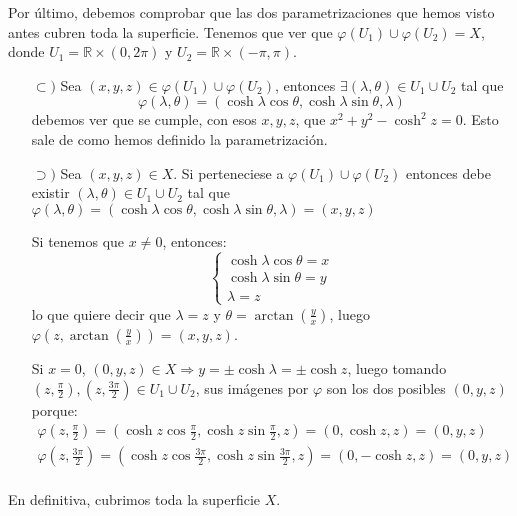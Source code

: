 Por último, debemos comprobar que las dos parametrizaciones que hemos visto
antes cubren toda la superficie. Tenemos que ver que $\varphi\left( U_1 \right) \cup
\varphi\left( U_2 \right) = X$, donde $U_1 = \mathbb{R} \times \left( 0, 2 \pi
\right) $ y $U_2 = \mathbb{R} \times \left( -\pi, \pi \right)$.
\begin{itemize}
\item[$\subset)$] Sea $\left( x, y, z \right) \in \varphi\left( U_1 \right)
    \cup \varphi\left( U_2 \right)$, entonces $\exists \left( \lambda, \theta
    \right) \in U_1 \cup U_2$ tal que
    \[
        \varphi\left( \lambda, \theta \right) =
        \left( \cosh \lambda \cos \theta, \cosh \lambda \sin \theta, \lambda \right)
    \]
    debemos ver que se cumple, con esos $x, y, z$, que $x^2 + y^2 - \cosh^2 z =
    0$. Esto sale de como hemos definido la parametrización. 

\item[$\supset)$] Sea $\left( x, y, z \right) \in X$. Si perteneciese a
    $\varphi\left( U_1 \right) \cup \varphi\left( U_2 \right)$ entonces debe
    existir $\left( \lambda, \theta \right) \in U_1 \cup U_2$ tal que
    $\varphi\left( \lambda, \theta \right) = \left( \cosh \lambda \cos \theta,
    \cosh \lambda \sin \theta, \lambda \right) = \left( x, y, z \right)$

    Si tenemos que $x \neq  0$, entonces:
    \[
    \begin{cases}
        \cosh \lambda \cos \theta = x\\
        \cosh \lambda \sin \theta = y\\
        \lambda = z
    \end{cases}
    \]
    lo que quiere decir que $\lambda = z$ y $\theta = \arctan\left( \frac{y}{x}
    \right)$, luego $\varphi\left( z, \arctan\left( \frac{y}{x} \right) \right)
    = \left( x, y, z \right)$.

    Si $x = 0$, $\left( 0, y, z \right) \in X \Rightarrow y = \pm \cosh \lambda
    = \pm \cosh z$, luego tomando $\left( z, \frac{\pi}{2} \right), \left( z,
    \frac{3 \pi}{2} \right) \in U_1 \cup U_2$, sus imágenes por $\varphi$ son
    los dos posibles $\left( 0, y, z\right)$ porque: 
    \begin{gather*}
        \varphi\left( z, \frac{\pi}{2} \right) = \left( \cosh z \cos
        \frac{\pi}{2}, \cosh z \sin \frac{\pi}{2}, z \right) = \left( 0, \cosh
        z, z \right) = \left( 0, y, z \right)\\ 
        \varphi\left( z, \frac{3\pi}{2}
        \right) = \left( \cosh z \cos \frac{3\pi}{2}, \cosh z \sin \frac{3\pi}{2}, z
        \right) = \left( 0, -\cosh z, z \right) = \left( 0, y, z \right)\\
    \end{gather*}
\end{itemize}
En definitiva, cubrimos toda la superficie $X$.
